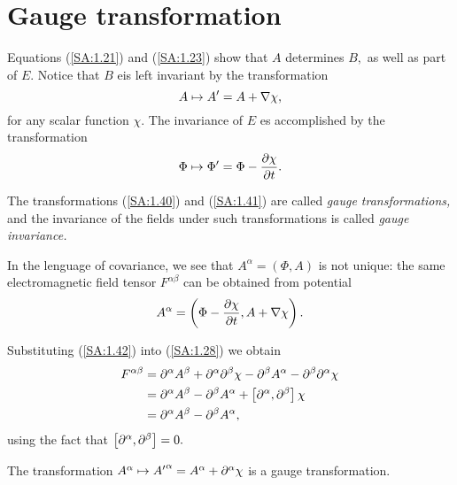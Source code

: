 \section{Gauge transformation}

Equations (\ref{SA:1.21}) and (\ref{SA:1.23}) show that $A$ determines $B,$ as well as part of $E.$ Notice that $B$ eis left invariant by the transformation
\begin{equation}
\label{SA:1.40}
A \mapsto A'=A + \nabla \chi,
\end{equation}
for any scalar function $\chi.$ The invariance of $E$ es accomplished by the transformation 
\begin{equation}
\label{SA:1.41}
\Phi \mapsto \Phi'=\Phi- \frac{\partial \chi}{\partial t}.
\end{equation}

The transformations (\ref{SA:1.40}) and (\ref{SA:1.41}) are called \emph{gauge transformations,} and the invariance of the fields under such transformations is called \emph{gauge invariance.}

In the lenguage of covariance, we see that $A^{\alpha}=(\Phi, A)$ is not unique: the same electromagnetic field tensor $F^{\alpha \beta}$ can be obtained from potential
\begin{equation}
\label{SA:1.42}
A^{\alpha}=\left( \Phi- \frac{\partial \chi}{\partial t}, A + \nabla \chi \right).
\end{equation}

Substituting (\ref{SA:1.42}) into (\ref{SA:1.28}) we obtain
\begin{align*}
F^{\alpha \beta} &= \partial^{\alpha}A^{\beta} + \partial^{\alpha}\partial^{\beta}\chi - \partial^{\beta}A^{\alpha} - \partial^{\beta}\partial^{\alpha} \chi \\
&= \partial^{\alpha}A^{\beta} - \partial^{\beta}A^{\alpha} + \left[ \partial^{\alpha}, \partial^{\beta}\right] \chi \\
&= \partial^{\alpha}A^{\beta} - \partial^{\beta}A^{\alpha},
\end{align*}
using the fact that $\left[ \partial^{\alpha}, \partial^{\beta}\right]=0.$
\begin{rem}
The transformation $A^{\alpha} \mapsto {A'}^{\alpha}= A^{\alpha} + \partial^{\alpha} \chi$ is a gauge transformation.
\end{rem}